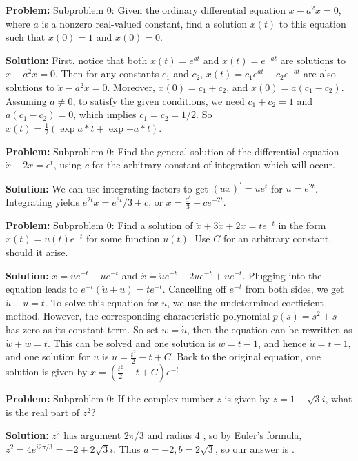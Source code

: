 \documentclass[10pt]{article}
\begin{document}
\textbf{Problem:}
Subproblem 0: Given the ordinary differential equation $\ddot{x}-a^{2} x=0$, where $a$ is a nonzero real-valued constant, find a solution $x(t)$ to this equation such that $x(0) = 1$ and $\dot{x}(0)=0$.


\textbf{Solution:}
First, notice that both $x(t)=e^{a t}$ and $x(t)=e^{-a t}$ are solutions to $\ddot{x}-a^{2} x=0$. Then for any constants $c_{1}$ and $c_{2}$, $x(t)=c_{1} e^{a t}+c_{2} e^{-a t}$ are also solutions to $\ddot{x}-a^{2} x=0$. Moreover, $x(0)=c_{1}+c_{2}$, and $\dot{x}(0)=a\left(c_{1}-c_{2}\right)$. Assuming $a \neq 0$, to satisfy the given conditions, we need $c_{1}+c_{2}=1$ and $a\left(c_{1}-c_{2}\right)=0$, which implies $c_{1}=c_{2}=1 / 2$. So $x(t)=\boxed{\frac{1}{2}(\exp{a*t} + \exp{-a*t})}$.


\textbf{Problem:}
Subproblem 0: Find the general solution of the differential equation $\dot{x}+2 x=e^{t}$, using $c$ for the arbitrary constant of integration which will occur.


\textbf{Solution:}
We can use integrating factors to get $(u x)^{\prime}=u e^{t}$ for $u=e^{2 t}$. Integrating yields $e^{2 t} x=e^{3 t} / 3+c$, or $x=\boxed{\frac{e^{t}} {3}+c e^{-2 t}}$. 


\textbf{Problem:}
Subproblem 0: Find a solution of $\ddot{x}+3 \dot{x}+2 x=t e^{-t}$ in the form $x(t)=u(t) e^{-t}$ for some function $u(t)$.  Use $C$ for an arbitrary constant, should it arise.


\textbf{Solution:}
$\dot{x}=\dot{u} e^{-t}-u e^{-t}$ and $\ddot{x}=\ddot{u} e^{-t}-2 \dot{u} e^{-t}+u e^{-t}$. Plugging into the equation leads to $e^{-t}(\ddot{u}+\dot{u})=t e^{-t}$. Cancelling off $e^{-t}$ from both sides, we get $\ddot{u}+\dot{u}=t$. To solve this equation for $u$, we use the undetermined coefficient method. However, the corresponding characteristic polynomial $p(s)=s^{2}+s$ has zero as its constant term. So set $w=\dot{u}$, then the equation can be rewritten as $\dot{w}+w=t$. This can be solved and one solution is $w=t-1$, and hence $\dot{u}=t-1$, and one solution for $u$ is $u=\frac{t^{2}}{2}-t+C$. Back to the original equation, one solution is given by $x=\boxed{\left(\frac{t^{2}}{2}-t+C\right) e^{-t}}$


\textbf{Problem:}
Subproblem 0: If the complex number $z$ is given by $z = 1+\sqrt{3} i$, what is the real part of $z^2$?


\textbf{Solution:}
$z^{2}$ has argument $2 \pi / 3$ and radius 4 , so by Euler's formula, $z^{2}=4 e^{i 2 \pi / 3}=-2+2 \sqrt{3} i$. Thus $a = -2, b = 2\sqrt 3$, so our answer is .
\end{document}
